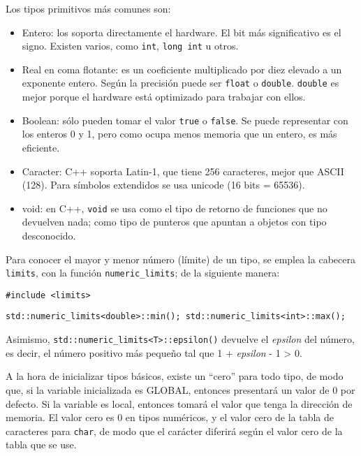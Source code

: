 \documentclass[a4paper]{article}
\begin{document}
	Los tipos primitivos más comunes son:
	\begin{itemize}
		\item Entero: los soporta directamente el hardware. El bit más significativo es el signo. Existen varios, como \verb|int|, \verb|long int| u otros.
		\item Real en coma flotante: es un coeficiente multiplicado por diez elevado a un exponente entero. Según la precisión puede ser \verb|float| o \verb|double|. \verb|double| es mejor porque el hardware está optimizado para trabajar con ellos.
		\item Boolean: sólo pueden tomar el valor \verb|true| o \verb|false|. Se puede representar con los enteros 0 y 1, pero como ocupa menos memoria que un entero, es más eficiente.
		\item Caracter: C++ soporta Latin-1, que tiene 256 caracteres, mejor que ASCII (128). Para símbolos extendidos se usa unicode (16 bits = 65536).
		\item void: en C++, \verb|void| se usa como el tipo de retorno de funciones que no devuelven nada; como tipo de punteros que apuntan a objetos con tipo desconocido.
	\end{itemize}
	
	Para conocer el mayor y menor número (límite) de un tipo, se emplea la cabecera \verb|limits|, con la función \verb|numeric_limits|; de la siguiente manera:
	
	 \verb|#include <limits>|
	 
	 \verb|std::numeric_limits<double>::min(); std::numeric_limits<int>::max();|
	
	Asimismo, \verb|std::numeric_limits<T>::epsilon()| devuelve el \textit{epsilon} del número, es decir, el número positivo más pequeño tal que 1 + \textit{epsilon} - 1 > 0.
	
	A la hora de inicializar tipos básicos, existe un ``cero'' para todo tipo, de modo que, si la variable inicializada es GLOBAL, entonces presentará un valor de 0 por defecto. Si la variable es local, entonces tomará el valor que tenga la dirección de memoria. El valor cero es 0 en tipos numéricos, y el valor cero de la tabla de caracteres para \verb|char|, de modo que el carácter diferirá según el valor cero de la tabla que se use.
	
\end{document}
